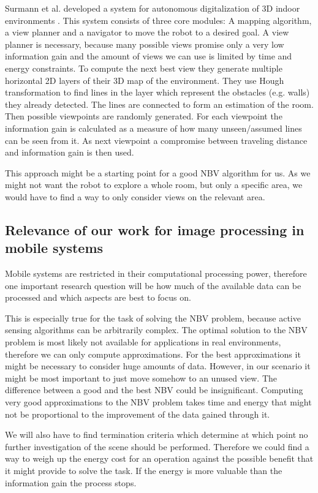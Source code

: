 \documentclass[a4paper,11pt,english]{article}
\begin{document}
Surmann et al. developed a system for autonomous digitalization of 3D indoor environments \cite{surmann2003autonomous}.
This system consists of three core modules: A mapping algorithm, a view planner and a navigator to move the robot to a desired goal.
A view planner is necessary, because many possible views promise only a very low information gain and the amount of views we can use is limited by time and energy constraints.
To compute the next best view they generate multiple horizontal 2D layers of their 3D map of the environment.
They use Hough transformation to find lines in the layer which represent the obstacles (e.g. walls) they already detected.
The lines are connected to form an estimation of the room. Then possible viewpoints are randomly generated.
For each viewpoint the information gain is calculated as a measure of how many unseen/assumed lines can be seen from it.
As next viewpoint a compromise between traveling distance and information gain is then used.

This approach might be a starting point for a good NBV algorithm for us. As we might not want the robot to explore a whole room, but only a specific area, we would have to find a way to only consider views on the relevant area.

\subsection{Relevance of our work for image processing in mobile systems}
Mobile systems are restricted in their computational processing power, therefore one important research question will be how much of the available data can be processed and which aspects are best to focus on. 

This is especially true for the task of solving the NBV problem, because active sensing algorithms can be arbitrarily complex.
The optimal solution to the NBV problem is most likely not available for applications in real environments, therefore we can only compute approximations. For the best approximations it might be necessary to consider huge amounts of data.
However, in our scenario it might be most important to just move somehow to an unused view. The difference between a good and the best NBV could be insignificant.
Computing very good approximations to the NBV problem takes time and energy that might not be proportional to the improvement of the data gained through it.

We will also have to find termination criteria which determine at which point no further investigation of the scene should be performed.
Therefore we could find a way to weigh up the energy cost for an operation against the possible benefit that it might provide to solve the task.
If the energy is more valuable than the information gain the process stops.
\end{document}
